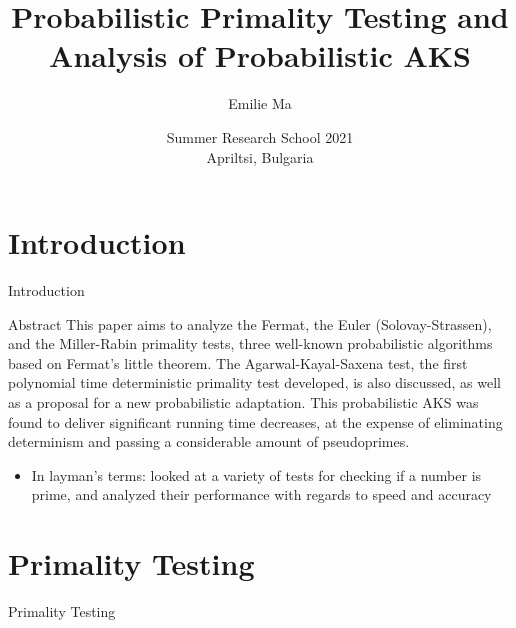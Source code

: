 \documentclass[pdf]{beamer}
\title[Primality Testing]{Probabilistic Primality Testing and Analysis of Probabilistic AKS}
\author[Emilie Ma]{Emilie Ma}
\date[SRS'21]{Summer Research School 2021\\Apriltsi, Bulgaria}
\begin{document}
\begin{frame}
    \thispagestyle{empty}
    \titlepage
\end{frame}
\addtocounter{framenumber}{-1}

\section{Introduction}
\begin{frame}{Introduction}
    \fontsize{8}{9}\selectfont
    \begin{block}{Abstract}
        This paper aims to analyze the Fermat, the Euler (Solovay-Strassen), and the Miller-Rabin primality tests, three well-known probabilistic algorithms based on Fermat's little theorem. The Agarwal-Kayal-Saxena test, the first polynomial time deterministic primality test developed, is also discussed, as well as a proposal for a new probabilistic adaptation. This probabilistic AKS was found to deliver significant running time decreases, at the expense of eliminating determinism and passing a considerable amount of pseudoprimes.
    \end{block}
    \pause
    \normalfont
    \begin{itemize}
        \item{In layman's terms: looked at a variety of tests for checking if a number is prime, and analyzed their performance with regards to speed and accuracy}
    \end{itemize}
\end{frame}

\section{Primality Testing}
\begin{frame}{Primality Testing}
    \begin{outline}
        \pause
    \end{outline}
\end{frame}
\end{document}
